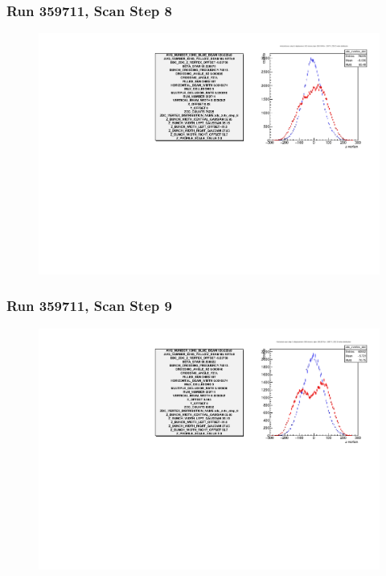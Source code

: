 \begin{frame}
\frametitle{Run 359711, Scan Step 8}
\begin{figure}
\begin{center}
\includegraphics[width=\linewidth]{"figures/359711_step_8_zdc_zvertex"}
\caption{ }
\label{fig:359711_step_8_zdc_zvertex}
\end{center}\end{figure}
\end{frame}

\begin{frame}
\frametitle{Run 359711, Scan Step 9}
\begin{figure}
\begin{center}
\includegraphics[width=\linewidth]{"figures/359711_step_9_zdc_zvertex"}
\caption{ }
\label{fig:359711_step_9_zdc_zvertex}
\end{center}\end{figure}
\end{frame}

